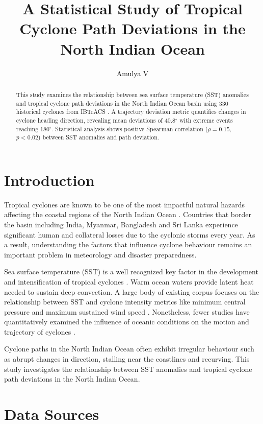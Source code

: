 \documentclass[11pt,a4paper]{article}
\title{A Statistical Study of Tropical Cyclone Path Deviations in the North Indian Ocean}
\author{Amulya V}
\begin{document}
\maketitle

\begin{abstract}
This study examines the relationship between sea surface temperature (SST) anomalies and tropical cyclone path deviations in the North Indian Ocean basin using 330 historical cyclones from IBTrACS \cite{ibtracs}. A trajectory deviation metric quantifies changes in cyclone heading direction, revealing mean deviations of 40.8$^\circ$ with extreme events reaching 180$^\circ$. Statistical analysis shows positive Spearman correlation ($\rho=0.15$, $p<0.02$) between SST anomalies and path deviation.
\end{abstract}


\section{Introduction}

Tropical cyclones are known to be one of the most impactful natural hazards affecting the coastal regions of the North Indian Ocean \cite{imdannual}. Countries that border the basin including India, Myanmar, Bangladesh and Sri Lanka experience significant human and collateral losses due to the cyclonic storms every year. As a result, understanding the factors that influence cyclone behaviour remains an important problem in meteorology and disaster preparedness. 

Sea surface temperature (SST) is a well recognized key factor in the development and intensification of tropical cyclones \cite{gray1979}. Warm ocean waters provide latent heat needed to sustain deep convection. A large body of existing corpus focuses on the relationship between SST and cyclone intensity metrics like minimum central pressure and maximum sustained wind speed \cite{emanuel2005}. Nonetheless, fewer studies have quantitatively examined the influence of oceanic conditions on the motion and trajectory of cyclones \cite{roy2012}.

Cyclone paths in the North Indian Ocean often exhibit irregular behaviour such as abrupt changes in direction, stalling near the coastlines and recurving. This study investigates the relationship between SST anomalies and tropical cyclone path deviations in the North Indian Ocean. 

\section{Data Sources}
\end{document}
